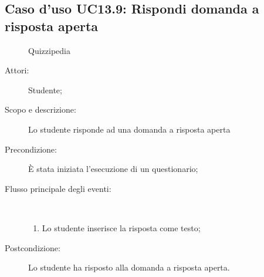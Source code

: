 \subsection{Caso d'uso UC13.9: Rispondi domanda a risposta aperta}
	\begin{figure}[H]
		\centering
		\begin{resizedtikzpicture}{\textwidth}
		\begin{umlsystem}[x=0, fill=lightgray!20]{Quizzipedia}
		\end{umlsystem}
		\end{resizedtikzpicture}
		\caption{}
	\end{figure}
\begin{description}
\item[Attori:] Studente;
\item[Scopo e descrizione:] Lo studente risponde ad una domanda a risposta aperta
      \item[Precondizione:] È stata iniziata l'esecuzione di un questionario;

        \item[Flusso principale degli eventi:] \ 
 \begin{enumerate}
          \item Lo studente inserisce la risposta come testo;

      \end{enumerate}
    \item[Postcondizione:] Lo studente ha risposto alla domanda a risposta aperta.
  \end{description}
\hypertarget{UC13.10}{}
